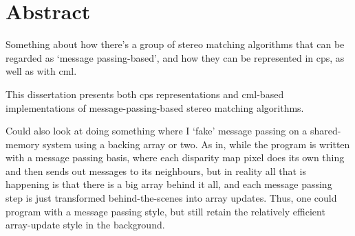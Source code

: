 

\chapter*{Abstract}
Something about how there's a group of stereo matching algorithms that can be regarded as `message passing-based', and how they can be represented in \gls{cps}, as well as with \gls{cml}.

This dissertation presents both \gls{cps} representations and \gls{cml}-based implementations of message-passing-based stereo matching algorithms.

Could also look at doing something where I `fake' message passing on a shared-memory system using a backing array or two.  As in, while the program is written with a message passing basis, where each disparity map pixel does its own thing and then sends out messages to its neighbours, but in reality all that is happening is that there is a big array behind it all, and each message passing step is just transformed behind-the-scenes into array updates.  Thus, one could program with a message passing style, but still retain the relatively efficient array-update style in the background.